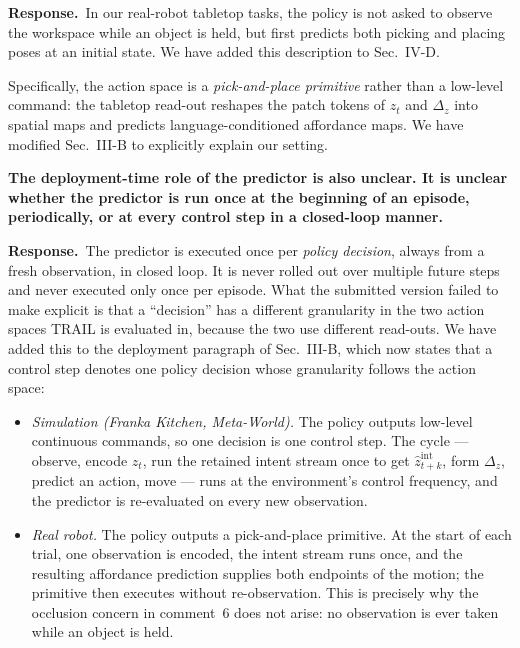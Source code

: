 \documentclass[11pt,a4paper]{article}
\newcommand{\C}[1]{\textbf{#1}\par\vspace{2pt}}
\newcommand{\R}[1]{\textbf{Response.}~#1}
\begin{document}
\begin{qa}
\R{In our real-robot tabletop tasks, the policy is not asked to observe the workspace while an object is held, but first predicts both picking and placing poses at an initial state. We have added this description to Sec.~IV-D.


Specifically, the action space is a \emph{pick-and-place primitive} rather than a low-level command: the tabletop read-out reshapes the patch tokens of $z_t$ and $\Delta_z$ into spatial maps and predicts language-conditioned affordance maps. We have modified Sec.~III-B to explicitly explain our setting.}


\item \C{The deployment-time role of the predictor is also unclear. It is unclear whether the
predictor is run once at the beginning of an episode, periodically, or at every control step in a
closed-loop manner.}
\R{The predictor is executed once per \emph{policy decision}, always from a fresh observation, in
closed loop. It is never rolled out over multiple future steps and never executed only once per
episode. What the submitted version failed to make explicit is that a ``decision'' has a different
granularity in the two action spaces TRAIL is evaluated in, because the two use different
read-outs. We have added this to the deployment paragraph of Sec.~III-B, which now states that a
control step denotes one policy decision whose granularity follows the action space:

\begin{itemize}[leftmargin=1.4em,itemsep=3pt,topsep=4pt]
  \item \emph{Simulation (Franka Kitchen, Meta-World).} The policy outputs low-level continuous
        commands, so one decision is one control step. The cycle --- observe, encode $z_t$, run the
        retained intent stream once to get $\hat z^{\mathrm{int}}_{t+k}$, form $\Delta_z$, predict
        an action, move --- runs at the environment's control frequency, and the predictor is
        re-evaluated on every new observation.
  \item \emph{Real robot.} The policy outputs a pick-and-place primitive. At the start of each trial, one observation is encoded, the intent stream runs once, and the resulting affordance prediction supplies both endpoints of the motion; the primitive then executes without re-observation. This is precisely why the occlusion concern in comment~6 does not arise: no observation is ever taken while an object is held.
\end{itemize}

}
\end{qa}
\end{document}
